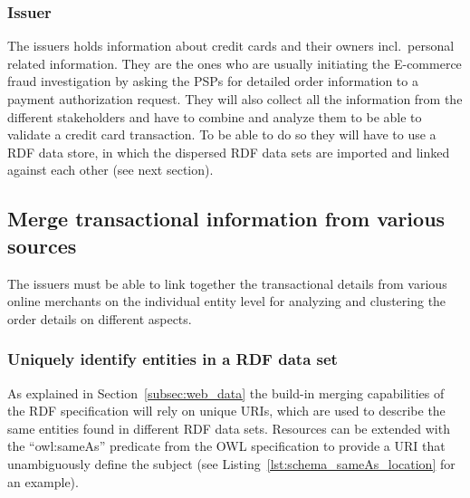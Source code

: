 \subsubsection{Issuer}
\label{subsub:prep_info_issuer}

The issuers holds information about credit cards and their owners incl.\ personal related information. They are the ones who are usually initiating the \gls{E-commerce} fraud investigation by asking the \gls{PSP}s for detailed order information to a payment authorization request. They will also collect all the information from the different stakeholders and have to combine and analyze them to be able to validate a credit card transaction. To be able to do so they will have to use a \gls{RDF} data store, in which the dispersed \gls{RDF} data sets are imported and linked against each other (see next section).

\subsection{Merge transactional information from various sources}
\label{subsec:information_mapping}

The issuers must be able to link together the transactional details from various online merchants on the individual entity level for analyzing and clustering the order details on different aspects.

\subsubsection{Uniquely identify entities in a \gls{RDF} data set}
\label{subsub:info_unique_id}

As explained in Section~\ref{subsec:web_data} the build-in merging capabilities of the \gls{RDF} specification will rely on unique \gls{URI}s, which are used to describe the same entities found in different \gls{RDF} data sets. Resources can be extended with the ``owl:sameAs'' predicate from the \gls{OWL} specification to provide a \gls{URI} that unambiguously define the subject (see Listing~\ref{lst:schema_sameAs_location} for an example). \@


